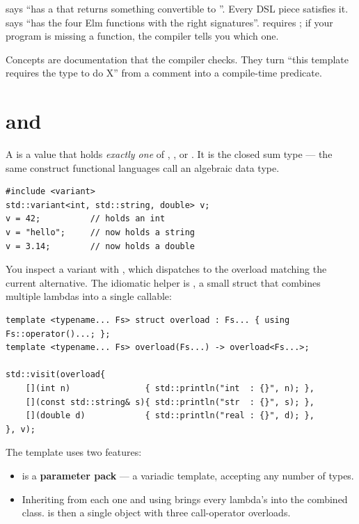  says ``has a  that returns something
convertible to ''. Every DSL piece satisfies it.
 says ``has the four Elm functions with the right
signatures''.  requires ; if your
program is missing a function, the compiler tells you which one.

\begin{idea}
Concepts are documentation that the compiler checks. They turn
``this template requires the type to do X'' from a comment into a
compile-time predicate.
\end{idea}

\section{ and }
\label{sec:cpp:variant}

A  is a value that holds \emph{exactly
one} of , , or . It is the \cpp{} closed sum
type --- the same construct functional languages call an algebraic
data type.

\begin{lstlisting}
#include <variant>
std::variant<int, std::string, double> v;
v = 42;          // holds an int
v = "hello";     // now holds a string
v = 3.14;        // now holds a double
\end{lstlisting}

You inspect a variant with , which dispatches to
the overload matching the current alternative. The idiomatic helper
is , a small struct that combines multiple lambdas
into a single callable:

\begin{lstlisting}
template <typename... Fs> struct overload : Fs... { using Fs::operator()...; };
template <typename... Fs> overload(Fs...) -> overload<Fs...>;

std::visit(overload{
    [](int n)               { std::println("int  : {}", n); },
    [](const std::string& s){ std::println("str  : {}", s); },
    [](double d)            { std::println("real : {}", d); },
}, v);
\end{lstlisting}

The  template uses two features:

\begin{itemize}[leftmargin=*]
  \item {} is a \textbf{parameter pack} --- a variadic
    template, accepting any number of types.
  \item Inheriting from each one and using  brings every lambda's  into
    the combined class.  is then a single
    object with three call-operator overloads.
\end{itemize}

